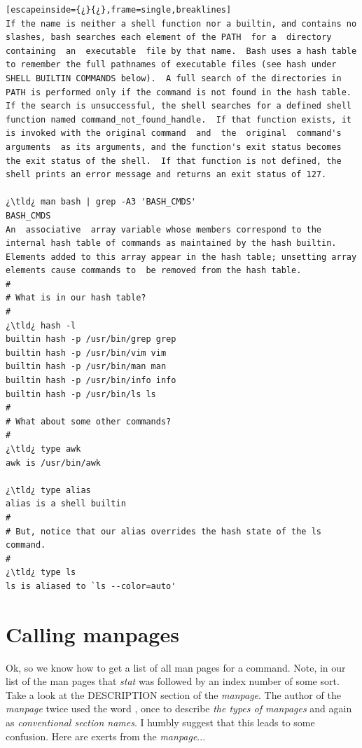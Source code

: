 \begin{lstlisting}[escapeinside={¿}{¿},frame=single,breaklines]
If the name is neither a shell function nor a builtin, and contains no slashes, bash searches each element of the PATH  for a  directory  containing  an  executable  file by that name.  Bash uses a hash table to remember the full pathnames of executable files (see hash under SHELL BUILTIN COMMANDS below).  A full search of the directories in PATH is performed only if the command is not found in the hash table.  If the search is unsuccessful, the shell searches for a defined shell function named command_not_found_handle.  If that function exists, it is invoked with the original command  and  the  original  command's  arguments  as its arguments, and the function's exit status becomes the exit status of the shell.  If that function is not defined, the shell prints an error message and returns an exit status of 127.

¿\tld¿ man bash | grep -A3 'BASH_CMDS'
BASH_CMDS
An  associative  array variable whose members correspond to the internal hash table of commands as maintained by the hash builtin.  Elements added to this array appear in the hash table; unsetting array elements cause commands to  be removed from the hash table.
#
# What is in our hash table?
#
¿\tld¿ hash -l
builtin hash -p /usr/bin/grep grep
builtin hash -p /usr/bin/vim vim
builtin hash -p /usr/bin/man man
builtin hash -p /usr/bin/info info
builtin hash -p /usr/bin/ls ls
#
# What about some other commands?
# 
¿\tld¿ type awk
awk is /usr/bin/awk

¿\tld¿ type alias
alias is a shell builtin
#
# But, notice that our alias overrides the hash state of the ls command.
#
¿\tld¿ type ls
ls is aliased to `ls --color=auto'

\end{lstlisting}

\section{Calling manpages}

Ok, so we know how to get a list of all man pages for a command. Note, in our list of the  man pages that \emph{stat} was followed by an index number of some sort. Take a look at the \small{DESCRIPTION} section of the  \emph{manpage}.  The author of the  \emph{manpage} twice used the word , once to describe \emph{the types of manpages} and again as \emph{conventional section names}. I humbly suggest that this leads to some confusion. Here are exerts from the  \emph{manpage}...

